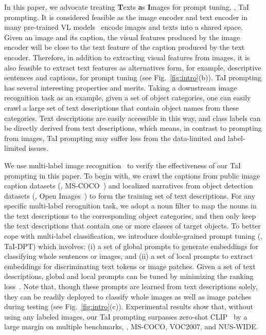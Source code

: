 \documentclass[10pt,twocolumn,letterpaper]{article}
\begin{document}
In this paper, we advocate treating \textbf{T}exts \textbf{a}s \textbf{I}mages for prompt tuning, \ie, TaI prompting. It is considered feasible as the image encoder and text encoder in many pre-trained VL models~\cite{clip,align} encode images and texts into a shared space. 
Given an image and its caption, the visual features produced by the image encoder will be close to the text feature of the caption produced by the text encoder.  
Therefore, in addition to extracting visual features from images, it is also feasible to extract text features as alternatives form, for example, descriptive sentences and captions, for prompt tuning (see Fig.~\ref{fig:intro}(b)). 
TaI prompting has several interesting properties and merits.
Taking a downstream image recognition task as an example, given a set of object categories, one can easily crawl a large set of text descriptions that contain object names from these categories. 
Text descriptions are easily accessible in this way, and class labels can be directly derived from text descriptions, which means, 
in contrast to prompting from images, TaI prompting may suffer less from the data-limited and label-limited issues.
















We use multi-label image recognition~\cite{voc2007,coco,nuswide,chen2019multi,ye2020add} to verify the effectiveness of our TaI prompting in this paper. 
To begin with, we crawl the captions from public image caption datasets (\eg, MS-COCO~\cite{coco}) and localized narratives from object detection datasets (\eg, Open
Images~\cite{openimages}) to form the training set of text descriptions.
For any specific multi-label recognition task, we adopt a noun filter to map the nouns in the text descriptions to the corresponding object categories, and then only keep the text descriptions that contain one or more classes of target objects.
To better cope with multi-label classification, we introduce double-grained prompt tuning (\ie, TaI-DPT) which involves: (i) a set of global prompts to generate embeddings for classifying whole sentences or images, and (ii) a set of local prompts to extract embeddings for discriminating text tokens or image patches. 
Given a set of text descriptions, global and local prompts can be tuned by minimizing the ranking loss~\cite{rankingloss}.
Note that, though these prompts are learned from text descriptions solely, they can be readily deployed to classify whole images as well as image patches during testing (see Fig.~\ref{fig:intro}(c)). 
Experimental results show that, without using any labeled images, our TaI prompting surpasses zero-shot CLIP~\cite{clip} by a large margin on multiple benchmarks, \eg, MS-COCO, VOC2007, and NUS-WIDE. 
\end{document}
